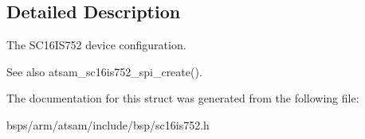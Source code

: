 \subsection{Detailed Description}
The S\+C16\+I\+S752 device configuration. 

\begin{DoxySeeAlso}{See also}
atsam\+\_\+sc16is752\+\_\+spi\+\_\+create(). 
\end{DoxySeeAlso}


The documentation for this struct was generated from the following file\+:\begin{DoxyCompactItemize}
\item 
bsps/arm/atsam/include/bsp/sc16is752.\+h\end{DoxyCompactItemize}
